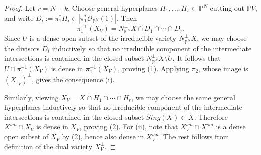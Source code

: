 \documentclass[10pt,a4paper]{amsart}
\begin{document}
\begin{proof}
Let $r=N-k$. Choose general hyperplanes $H_1,\dots,H_r\subset \mathbb P^N$
cutting out $\mathbb PV$, and write
$D_i:=\pi_1^*H_i \in |\pi_1^*\mathcal O_{\mathbb P^N}(1)|$. Then
\[
\pi_1^{-1}(X_V)=N_{\mathbb P^N}^{\perp}X\cap D_1\cap\cdots\cap D_r.
\]
Since $U$ is a dense open subset of the irreducible variety
$N_{\mathbb P^N}^{\perp}X$, we may choose the divisors $D_i$ inductively so that
no irreducible component of the intermediate intersections is contained in the
closed subset $N_{\mathbb P^N}^{\perp}X\setminus U$.
It follows that
$U\cap \pi_1^{-1}(X_V)$
is dense in $\pi_1^{-1}(X_V)$, proving (1).
Applying $\pi_2$, whose image is $(X|_V)^\perp$, gives the consequence (i).

Similarly, viewing $X_V=X\cap H_1\cap\cdots\cap H_r$, we may choose the same
general hyperplanes inductively so that no irreducible component of the
intermediate intersections is contained in the closed subset $Sing(X)\subset X$.
Therefore $X^{sm}\cap X_V$
is dense in $X_V$, proving (2).
For (ii), note that
$X_V^{sm}\cap X^{sm}$
is a dense open subset of $X_V$ by (2), hence also dense in $X_V^{sm}$. The rest follows from definition of the dual variety $X_{V}^{\perp}$.
\end{proof}
\end{document}
